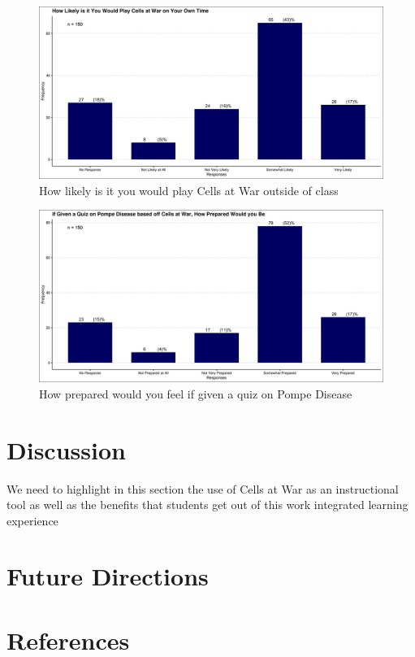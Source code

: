 \documentclass{article}
\begin{document}
\begin{figure}[H]
	\includegraphics[width=\textwidth]{figures_4f06/how_likely_you_would_play_cellsatwar.jpg}
	\caption{How likely is it you would play Cells at War outside of class}
	\label{fig:7}
\end{figure}

\begin{figure}[H]
	\includegraphics[width=\textwidth]{figures_4f06/how_prepared_if_tested_on_pompe_based_off_cellsatwar.jpg}
	\caption{How prepared would you feel if given a quiz on Pompe Disease}
	\label{fig:8}
\end{figure}

\section{Discussion}

We need to highlight in this section the use of Cells at War as an instructional tool as well as the benefits that students get out of this work integrated learning experience

\section{Future Directions}

\clearpage\newpage
\section{References}


\nocite{*}
\printbibliography[heading=none, sorting=nyt]
\newpage
\end{document}
